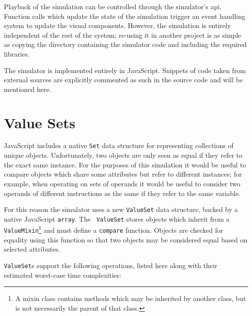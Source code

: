 \documentclass[bsc,twoside,singlespacing,parskip,logo,notimes,normalheadings]{infthesis}
\begin{document}
    Playback of the simulation can be controlled through the
    simulator's \gls{api}. Function calls which update the state of
    the simulation trigger an event handling system to update the
    visual components. However, the simulation is entirely independent
    of the rest of the system; re-using it in another project is as
    simple as copying the directory containing the simulator code and
    including the required libraries.

    The simulator is implemented entirely in JavaScript. Snippets of
    code taken from external sources are explicitly commented as such
    in the source code and will be mentioned here.

    \section{Value Sets}

    JavaScript includes a native {\tt Set} data structure for
    representing collections of unique objects. Unfortunately, two
    objects are only seen as equal if they refer to the exact same
    instance. For the purposes of this simulation it would be useful
    to compare objects which share some attributes but refer to
    different instances; for example, when operating on sets of
    operands it would be useful to consider two operands of different
    instructions as the same if they refer to the same variable.

    For this reason the simulator uses a new {\tt ValueSet} data
    structure, backed by a native JavaScript {\tt array}. The {\tt
      ValueSet} stores objects which inherit from a {\tt
      ValueMixin}\footnote{A mixin class contains methods which may be
      inherited by another class, but is not necessarily the parent of
      that class.} and must define a {\tt compare} function. Objects
    are checked for equality using this function so that two objects
    may be considered equal based on selected attributes.

    {\tt ValueSet}s support the following operations, listed here
    along with their estimated worst-case time complexities:
\end{document}
